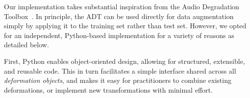 \documentclass{article}
\begin{document}
%
%
Our implementation takes substantial inspiration from the Audio Degradation
Toolbox~\cite{mauch2013audio}.  In principle, the ADT can be used directly
for data augmentation simply by applying it to the training set rather than test set.
However, we opted for an independent, Python-based implementation for a variety of
reasons as detailed below.

%
First, Python enables object-oriented design, allowing for structured,
extensible, and reusable code.  This in turn facilitates a simple interface shared across
all \emph{deformation objects}, and makes it easy for practitioners to combine existing
deformations, or implement new transformations with minimal effort.

%
\end{document}
